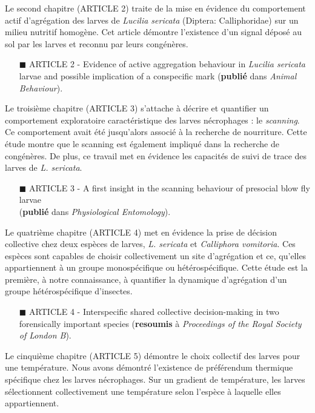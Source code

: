 Le second chapitre (ARTICLE 2) traite de la mise en évidence du comportement actif d'agrégation des larves de \textit{Lucilia sericata} (Diptera: Calliphoridae) sur un milieu nutritif homogène. Cet article démontre l'existence d'un signal déposé au sol par les larves et reconnu par leurs congénères.

\begin{itemize} 
\item[\tiny{$\blacksquare$}] ARTICLE 2 - Evidence of active aggregation behaviour in \textit{Lucilia sericata} larvae and possible implication of a conspecific mark (\textbf{publié} dans \textit{Animal Behaviour}).
\end{itemize}


Le troisième chapitre (ARTICLE 3) s'attache à décrire et quantifier un comportement exploratoire caractéristique des larves nécrophages : le \textit{scanning}. Ce comportement avait été jusqu'alors associé à la recherche de nourriture. Cette étude montre que le scanning est également impliqué dans la recherche de congénères. De plus, ce travail met en évidence les capacités de suivi de trace des larves de \textit{L. sericata}.

\begin{itemize} 
\item[\tiny{$\blacksquare$}] ARTICLE 3 - A first insight in the scanning behaviour of presocial blow fly larvae\\ (\textbf{publié} dans \textit{Physiological Entomology}).
\end{itemize}

Le quatrième chapitre (ARTICLE 4) met en évidence la prise de décision collective chez deux espèces de larves, \textit{L. sericata} et \textit{Calliphora vomitoria}. Ces espèces sont capables de choisir collectivement un site d'agrégation et ce, qu'elles appartiennent à un groupe monospécifique ou hétérospécifique. Cette étude est la première, à notre connaissance, à quantifier la dynamique d'agrégation d'un groupe hétérospécifique d'insectes.

\begin{itemize} 
\item[\tiny{$\blacksquare$}] ARTICLE 4 - Interspecific shared collective decision-making in two forensically important species (\textbf{resoumis} à \textit{Proceedings of the Royal Society of London B}).
\end{itemize}

Le cinquième chapitre (ARTICLE 5) démontre le choix collectif des larves pour une température. Nous avons démontré l'existence de préférendum thermique spécifique chez les larves nécrophages. Sur un gradient de température, les larves sélectionnent collectivement une température selon l'espèce à laquelle elles appartiennent.

